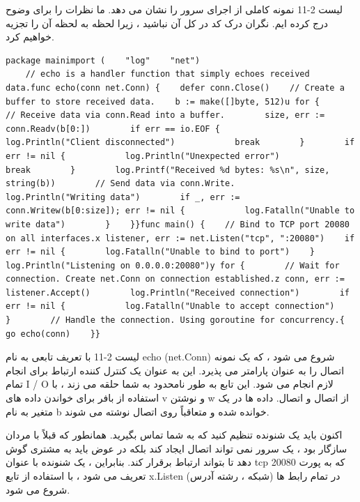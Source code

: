 \documentclass[12pt]{book}
\begin{document}
{لیست 2-11 نمونه کاملی از اجرای سرور را نشان می دهد. ما نظرات را برای وضوح درج کرده ایم. نگران درک کد در کل آن نباشید ، زیرا لحظه به لحظه آن را تجزیه خواهیم کرد.
\begin{latin}
	\begin{lstlisting}[caption={A basic echo server (https://gihub.com/blackhat-go/bhg/ch-2/echo-server/main.go/)},captionpos=b]
	package mainimport (    "log"    "net")
	// echo is a handler function that simply echoes received data.func echo(conn net.Conn) {    defer conn.Close()    // Create a buffer to store received data.    b := make([]byte, 512)u for {        // Receive data via conn.Read into a buffer.        size, err := conn.Readv(b[0:])        if err == io.EOF {            log.Println("Client disconnected")            break        }        if err != nil {            log.Println("Unexpected error")            break        }        log.Printf("Received %d bytes: %s\n", size, string(b))        // Send data via conn.Write.        log.Println("Writing data")        if _, err := conn.Writew(b[0:size]); err != nil {            log.Fatalln("Unable to write data")        }    }}func main() {    // Bind to TCP port 20080 on all interfaces.x listener, err := net.Listen("tcp", ":20080")    if err != nil {        log.Fatalln("Unable to bind to port")    }    log.Println("Listening on 0.0.0.0:20080")y for {        // Wait for connection. Create net.Conn on connection established.z conn, err := listener.Accept()        log.Println("Received connection")        if err != nil {            log.Fatalln("Unable to accept connection")        }        // Handle the connection. Using goroutine for concurrency.{ go echo(conn)    }}
	\end{lstlisting}
\end{latin}

لیست 2-11 با تعریف تابعی به نام echo (net.Conn) شروع می شود ، که یک نمونه اتصال را به عنوان پارامتر می پذیرد. این به عنوان یک کنترل کننده ارتباط برای انجام تمام I / O لازم انجام می شود. این تابع به طور نامحدود به شما حلقه می زند ، با استفاده از بافر برای خواندن داده های v و نوشتن w از اتصال و اتصال. داده ها در یک متغیر به نام b خوانده شده و متعاقباً روی اتصال نوشته می شوند.

اکنون باید یک شنونده تنظیم کنید که به شما تماس بگیرید. همانطور که قبلاً با مردان سازگار بود ، یک سرور نمی تواند اتصال ایجاد کند بلکه در عوض باید به مشتری گوش دهد تا بتواند ارتباط برقرار کند. بنابراین ، یک شنونده با عنوان tcp که به پورت 20080 تعریف می شود ، با استفاده از تابع x.Listen (شبکه ، رشته آدرس) در تمام رابط ها شروع می شود.

}
\end{document}
